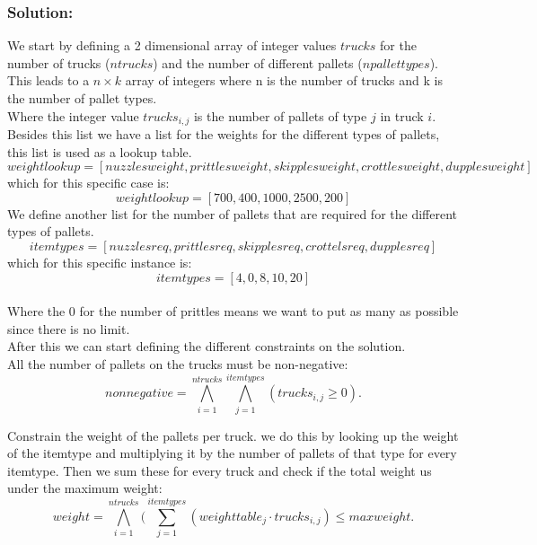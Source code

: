 \documentclass[12pt]{article}
\begin{document}
\vspace{8mm}

\newpage

\subsubsection*{Solution:}

We start by defining a 2 dimensional array of integer values $trucks$ for the number of trucks ($ntrucks$) and the number of different pallets ($npallettypes$). \\
This leads to a $n \times k$ array of integers where n is the number of trucks and k is the number of pallet types. \\
 Where the integer value $ trucks_{i,j} $ is the number of pallets of type $j$ in truck $i$. \\

Besides this list we have a list for the weights for the different types of pallets, this list is used as a lookup table. \\
\[ weightlookup = [nuzzlesweight, prittlesweight, skipplesweight, crottlesweight, dupplesweight] \]
which for this specific case is:
\[ weightlookup = [700, 400, 1000, 2500, 200] \]
We define another list for the number of pallets that are required for the different types of pallets.\\
\[ itemtypes = [nuzzlesreq, prittlesreq, skipplesreq, crottelsreq, dupplesreq] \]
which for this specific instance is:
\[ itemtypes = [4, 0, 8, 10, 20] \] \\
Where the 0 for the number of prittles means we want to put as many as possible since there is no limit.\\

After this we can start defining the different constraints on the solution.\\

All the number of pallets on the trucks must be non-negative: \\
\[ nonnegative = \bigwedge_{i=1}^{ntrucks} \bigwedge_{j=1}^{itemtypes} (trucks_{i,j} \geq 0). \]

Constrain the weight of the pallets per truck. we do this by looking up the weight of the itemtype and multiplying it by the number of pallets of that type for every itemtype. Then we sum these for every truck and check if the total weight us under the maximum weight: \\
\[ weight = \bigwedge_{i=1}^{ntrucks} ( \sum_{j=1}^{itemtypes} (weighttable_j \cdot trucks_{i,j} ) \leq maxweight. \]
\end{document}
